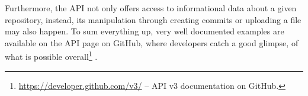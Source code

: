 Furthermore, the API not only offers access to informational data about a given repository, instead, its manipulation through creating commits or uploading a file may also happen. To sum everything up, very well documented examples are available on the API page on GitHub, where developers catch a good glimpse, of what is possible overall\footnote{\url{https://developer.github.com/v3/} -- API v3 documentation on GitHub.} \cite[401]{loeliger2012version}.
